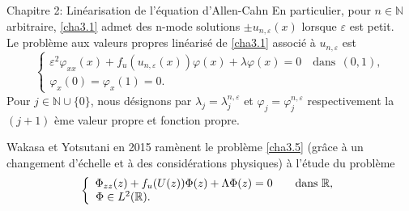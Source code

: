 \documentclass[mathserif,10pt]{beamer}
\begin{document}
\begin{frame}{Chapitre 2: Linéarisation de l'équation d'Allen-Cahn  }\transglitter[duration=1]
En particulier, pour $n \in \mathbb{N} $ arbitraire, \eqref{cha3.1} admet des n-mode solutions  $\pm u_{n,\varepsilon} (x)$ lorsque $\varepsilon $  est petit.\\
 Le problème aux valeurs propres linéarisé de \eqref{cha3.1} associé à $ u_{n,\varepsilon }$  est \pause
\begin{equation}\label{cha3.5}
\begin{cases}
\varepsilon^{2}\varphi_{xx}(x)+f_{u}(u_{n,\varepsilon }(x))\varphi (x) +\lambda \varphi (x)=0 \quad  \mathrm{dans} \ \ (0,1), \\
\varphi_{x}(0)=\varphi_{x}(1)=0.
\end{cases}
\end{equation}
Pour $ j \in \mathbb{N} \cup \{0\}$, nous désignons par $\lambda_{j} = \lambda_{j}^{n,\varepsilon }$ et $\varphi_{j} =\varphi_{j}^{n,\varepsilon }$ respectivement la $(j+1)$ ème valeur propre et fonction propre.\pause

Wakasa  et Yotsutani en 2015 ramènent le problème \eqref{cha3.5} (grâce à un changement d'échelle et à des considérations physiques) à l'étude du problème 
\begin{equation}\label{cha3.7}
\left\{ \begin{array}{cc}
\Phi_{zz}(z)+f_{u}(U(z))\Phi (z) + \Lambda \Phi (z) =0 & \quad \mathrm{ dans} \ \mathbb{R}, \\
\Phi \in L^{2} ( \mathbb{R} ). \hspace*{3.8cm}& \
\end{array} \right.
\end{equation}
\end{frame}
\end{document}
